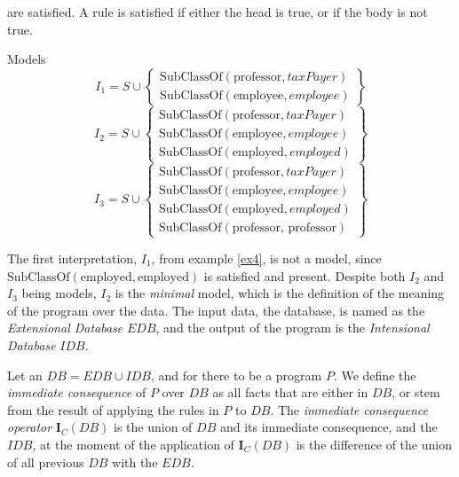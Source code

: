 are satisfied. A rule is satisfied if either the head is true, or if the body is not true.
\begin{exmp}{Models}\label{ex4}
	\[
		I_1 = S \cup \left\{  \begin{array}{l}
			\text{SubClassOf}(\text{professor}, {taxPayer}) \\
			\text{SubClassOf}(\text{employee}, {employee})
		\end{array}\right\}
	\]
	\[
		I_2 = S \cup \left\{  \begin{array}{l}
			\text{SubClassOf}(\text{professor}, {taxPayer}) \\
			\text{SubClassOf}(\text{employee}, {employee})  \\
			\text{SubClassOf}(\text{employed}, {employed})
		\end{array}\right\}
	\]
	\[
		I_3 = S \cup \left\{  \begin{array}{l}
			\text{SubClassOf}(\text{professor}, {taxPayer}) \\
			\text{SubClassOf}(\text{employee}, {employee} ) \\
			\text{SubClassOf}(\text{employed}, {employed})  \\
			\text{SubClassOf}(\text{professor, professor})
		\end{array}\right\}
	\]
\end{exmp}
The first interpretation, $I_1$, from example \ref{ex4}, is not a model, since $\text{SubClassOf}(\text{employed}, \text{employed})$ is satisfied
and present. Despite both $I_2$ and $I_3$ being models, $I_2$ is the \textit{minimal} model, which is the definition of the meaning of the program
over the data. The input data, the database, is named as the \textit{Extensional Database} $EDB$, and the output of the program is the \textit{Intensional Database}
$IDB$.

Let an $DB = EDB \cup IDB$, and for there to be a program $P$. We define the \textit{immediate consequence} of $P$ over $DB$ as all facts
that are either in $DB$, or stem from the result of applying the rules in $P$ to $DB$. The \textit{immediate consequence operator}
$\textbf{I}_C(DB)$ is the union of $DB$ and its immediate consequence, and the $IDB$, at the moment of the application of $\textbf{I}_C(DB)$
is the difference of the union of all previous $DB$ with the $EDB$.


